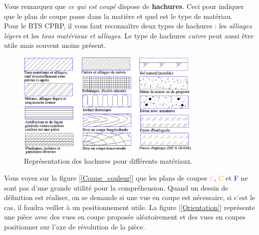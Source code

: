 \documentclass[
	11pt, %
	fleqn, %
	a4paper, %
]{LegrandOrangeBook}
\begin{document}
Vous remarquez que \textit{ce qui est coupé} dispose de \textbf{hachures}. Ceci pour indiquer que le plan de coupe passe dans la matière et quel est le type de matériau.\\
Pour le BTS CPRP, il vous faut reconnaître deux types de hachures : les \textit{alliages légers} et les \textit{tous matériaux et alliages}. Le type de hachures \textit{cuivre} peut aussi être utile mais souvent moins présent.

\begin{figure}[H] %
	\centering %
	\includegraphics[width=0.8\textwidth]{Images/hachures.png} %
	\caption{Représentation des hachures pour différents matériaux.}
	\label{hach} %
\end{figure}

Vous voyez sur la figure [\ref{Coupe_couleur}] que les plans de coupes \textcolor{Pink}{E}, \textcolor{Orange}{C} et \textcolor{Blue}{F} ne sont pas d'une grande utilité pour la compréhension. Quand un dessin de définition est réaliser, on se demande si une vue en coupe est nécessaire, si c'est le cas, il faudra veiller à un positionnement utile. La figure [\ref{Orientation}] représente une pièce avec des vues en coupe proposée aléatoirement et des vues en coupes positionner sur l'axe de révolution de la pièce. 
\end{document}
